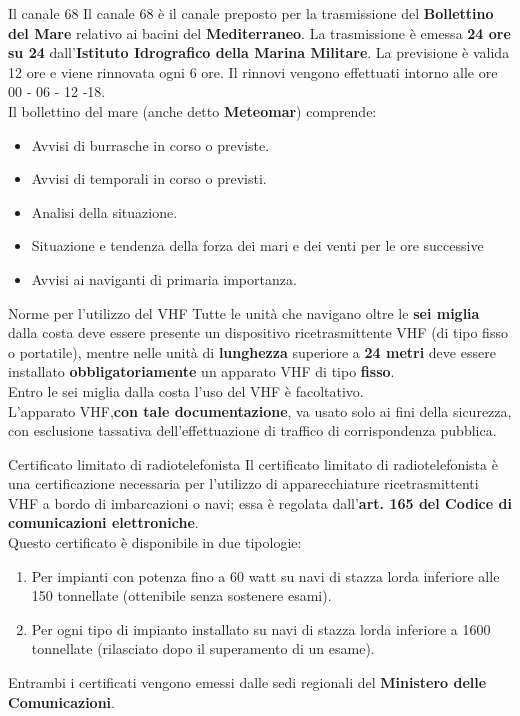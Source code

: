 \documentclass[aspectratio=169]{beamer}
\begin{document}
\begin{frame}{Il canale 68}
	Il canale 68 è il canale preposto per la trasmissione del \textbf{Bollettino del Mare} relativo ai bacini del \textbf{Mediterraneo}. La trasmissione è emessa \textbf{24 ore su 24} dall'\textbf{Istituto Idrografico della Marina Militare}.
	\smallskip
	La previsione è valida 12 ore e viene rinnovata ogni 6 ore. Il rinnovi vengono effettuati intorno alle ore 00 - 06 - 12 -18.\\
	\smallskip
	Il bollettino del mare (anche detto \textbf{Meteomar}) comprende:
	\begin{itemize}
		\item Avvisi di burrasche in corso o previste.
		\item Avvisi di temporali in corso o previsti.
		\item Analisi della situazione.
		\item Situazione e tendenza della forza dei mari e dei venti per le ore successive
		\item Avvisi ai naviganti di primaria importanza.
	\end{itemize}
\end{frame}

\begin{frame}{Norme per l'utilizzo del VHF}
	Tutte le unità che navigano oltre le \textbf{sei miglia} dalla costa deve essere presente un dispositivo ricetrasmittente VHF (di tipo fisso o portatile), mentre nelle unità di \textbf{lunghezza} superiore a \textbf{24 metri} deve essere installato \textbf{obbligatoriamente} un apparato VHF di tipo \textbf{fisso}.\\
	Entro le sei miglia dalla costa l'uso del VHF è facoltativo.\\
	\medskip
	{\textcolor{red!80}{L'apparato VHF,\textbf{con tale documentazione}, va usato solo ai fini della sicurezza, con esclusione tassativa dell'effettuazione di traffico di corrispondenza pubblica.}}
\end{frame}

\begin{frame}{Certificato limitato di radiotelefonista}
	Il certificato limitato di radiotelefonista è una certificazione necessaria per l'utilizzo di apparecchiature ricetrasmittenti VHF a bordo di imbarcazioni o navi; essa è regolata dall'\textbf{art. 165 del Codice di comunicazioni elettroniche}.\\
	\medskip
	Questo certificato è disponibile in due tipologie:
	\begin{enumerate}
		\item Per impianti con potenza fino a 60 watt su navi di stazza lorda inferiore alle 150 tonnellate (ottenibile senza sostenere esami).
		\item Per ogni tipo di impianto installato su navi di stazza lorda inferiore a 1600 tonnellate (rilasciato dopo il superamento di un esame).
	\end{enumerate}
\smallskip
Entrambi i certificati vengono emessi dalle sedi regionali del \textbf{Ministero delle \\Comunicazioni}.
\end{frame}
\end{document}
